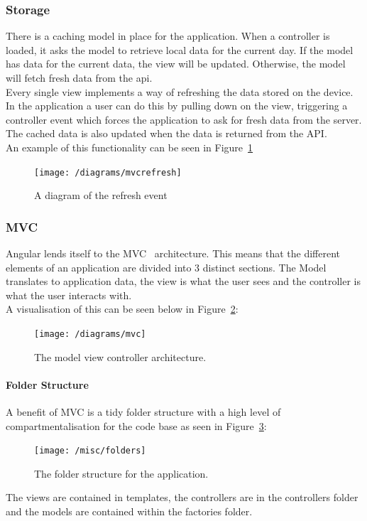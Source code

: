 \documentclass[preprint,12pt,3p]{elsarticle}
\begin{document}
\subsubsection{Storage}
There is a caching model in place for the application. When a controller is loaded, it asks the model to retrieve local data for the current day. If the model has data for the current data, the view will be updated. Otherwise, the model will fetch fresh data from the api.\\
Every single view implements a way of refreshing the data stored on the device. In the application a user can do this by pulling down on the view, triggering a controller event which forces the application to ask for fresh data from the server. The cached data is also updated when the data is returned from the API.\\
An example of this functionality can be seen in Figure~\ref{fig:mvcrefresh}

\begin{figure}[H]
    \centering
    \texttt{[image: /diagrams/mvcrefresh]}
    \caption {A diagram of the refresh event}
    \label{fig:mvcrefresh}
\end{figure}


\subsubsection{MVC}
Angular lends itself to the MVC~\cite{mvc} architecture. This means that the different elements of an application are divided into 3 distinct sections. The Model translates to application data, the view is what the user sees and the controller is what the user interacts with.\\
A visualisation of this can be seen below in Figure~\ref{fig:mvcdiag}:
\begin{figure}[H]
    \centering
    \texttt{[image: /diagrams/mvc]}
    \caption {The model view controller architecture.~\cite{mvcimage}}
    \label{fig:mvcdiag}
\end{figure}

\paragraph{Folder Structure}
A benefit of MVC is a tidy folder structure with a high level of compartmentalisation for the code base as seen in Figure~\ref{fig:folderstruct}:

\begin{figure}[H]
    \centering
    \texttt{[image: /misc/folders]}
    \caption {The folder structure for the application.}
    \label{fig:folderstruct}
\end{figure}
The views are contained in templates, the controllers are in the controllers folder and the models are contained within the factories folder.\\
\end{document}
